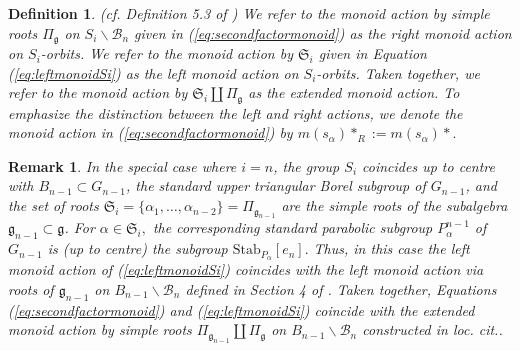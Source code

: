 \documentclass[12pt]{amsart}
\numberwithin{equation}{section}
\newtheorem{rem}[thm]{Remark}
\newtheorem{dfn}[thm]{Definition}
\newcommand{\fg}{\mbox{${\mathfrak g}$}}
\newcommand{\fb}{\mbox{${\mathfrak b}$}}
\newcommand{\B}{\mathcal{B}}
\newcommand{\ms}{m(s_{\alpha})}
\newcommand{\Borbitspace}{B_{n-1}\backslash\B_{n}}
\begin{document}

\begin{dfn}\label{d:leftandright}\emph{(cf. Definition 5.3 of \cite{Siorbits})}
We refer to the monoid action by simple roots $\Pi_{\fg}$ on $S_{i}\backslash\B_{n}$ given in (\ref{eq:secondfactormonoid}) as the \emph{right monoid} action on $S_{i}$-orbits.  We refer to the monoid action by $\mathfrak{S}_i$ given in Equation (\ref{eq:leftmonoidSi}) as the \emph{left monoid} action on $S_{i}$-orbits. Taken together, we refer to the monoid action by $\mathfrak{S}_i\coprod \Pi_{\fg}$ as the \emph{extended monoid action}.  To emphasize the distinction between the left and right actions, we denote the monoid action in (\ref{eq:secondfactormonoid}) by $\ms*_R := \ms*.$
\end{dfn}



\begin{rem}\label{r:extended}
In the special case where $i=n$, the group $S_{i}$ coincides up to centre with $B_{n-1}\subset G_{n-1}$, the standard upper triangular Borel subgroup of $G_{n-1}$, and the set of roots 
$\mathfrak{S}_i=\{\alpha_{1},\dots,\alpha_{n-2}\}=\Pi_{\fg_{n-1}}$ are the simple roots of  the subalgebra $\fg_{n-1}\subset\fg$.  For $\alpha \in \mathfrak{S}_i,$ the corresponding standard parabolic subgroup $P^{n-1}_{\alpha}$ of $G_{n-1}$  is (up to centre) the subgroup  $\mbox{Stab}_{P_{\alpha}}[e_{n}].$  Thus, in this case the left monoid action of (\ref{eq:leftmonoidSi}) coincides with the left monoid action via roots of $\fg_{n-1}$ on $\Borbitspace$ defined in Section 4 of \cite{CE21I}.  Taken together, Equations (\ref{eq:secondfactormonoid}) and (\ref{eq:leftmonoidSi}) coincide with the extended monoid action by simple roots $\Pi_{\fg_{n-1}}\coprod\Pi_{\fg}$ on $\Borbitspace$ constructed in \emph{loc. cit.}.
\end{rem}
\end{document}
